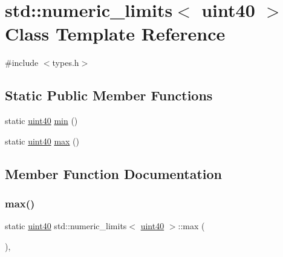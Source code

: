 \hypertarget{classstd_1_1numeric__limits_3_01uint40_01_4}{}\section{std\+:\+:numeric\+\_\+limits$<$ uint40 $>$ Class Template Reference}
\label{classstd_1_1numeric__limits_3_01uint40_01_4}


{\ttfamily \#include $<$types.\+h$>$}

\subsection*{Static Public Member Functions}
\begin{DoxyCompactItemize}
\item 
static \hyperlink{classuint40}{uint40} \hyperlink{classstd_1_1numeric__limits_3_01uint40_01_4_a42a1903dc50a04e31a067fef55745daf}{min} ()
\item 
static \hyperlink{classuint40}{uint40} \hyperlink{classstd_1_1numeric__limits_3_01uint40_01_4_a22582c529e203e9648b054d15bcb0564}{max} ()
\end{DoxyCompactItemize}


\subsection{Member Function Documentation}
\mbox{\label{classstd_1_1numeric__limits_3_01uint40_01_4_a22582c529e203e9648b054d15bcb0564}} 
\subsubsection{\texorpdfstring{max()}{max()}}
{\footnotesize\ttfamily static \hyperlink{classuint40}{uint40} std\+::numeric\+\_\+limits$<$ \hyperlink{classuint40}{uint40} $>$\+::max (\begin{DoxyParamCaption}{ }\end{DoxyParamCaption})\hspace{0.3cm}{\ttfamily [inline]}, {\ttfamily [static]}}

\mbox{\label{classstd_1_1numeric__limits_3_01uint40_01_4_a42a1903dc50a04e31a067fef55745daf}} 

